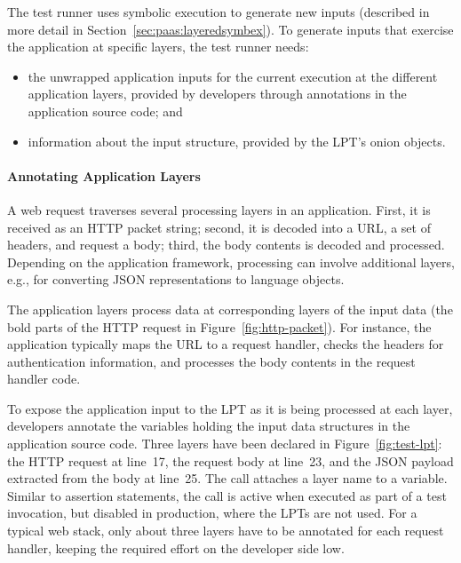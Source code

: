 The test runner uses symbolic execution to generate new inputs (described in more detail in Section~\ref{sec:paas:layeredsymbex}). To generate inputs that exercise the application at specific layers, the test runner needs:
\begin{itemize}
\item the unwrapped application inputs for the current execution at the different application layers, provided by developers through annotations in the application source code; and
\item information about the input structure, provided by the LPT's onion objects.
\end{itemize}

\paragraph{Annotating Application Layers}

A web request traverses several processing layers in an application.  First, it is received as an HTTP packet string; second, it is decoded into a URL, a set of headers, and request a body; third, the body contents is decoded and processed. Depending on the application framework, processing can involve additional layers, e.g., for converting JSON representations to language objects.

The application layers process data at corresponding layers of the input data (the bold parts of the HTTP request in Figure~\ref{fig:http-packet}). For instance, the application typically maps the URL to a request handler, checks the headers for authentication information, and processes the body contents in the request handler code.

To expose the application input to the LPT as it is being processed at each layer, developers annotate the variables holding the input data structures in the application source code.  Three layers have been declared in Figure~\ref{fig:test-lpt}: the HTTP request at line~17, the request body at line~23, and the JSON payload extracted from the body at line~25.  The  call attaches a layer name to a variable. Similar to assertion statements, the call is active when executed as part of a test invocation, but disabled in production, where the LPTs are not used.  For a typical web stack, only about three layers have to be annotated for each request handler, keeping the required effort on the developer side low.


